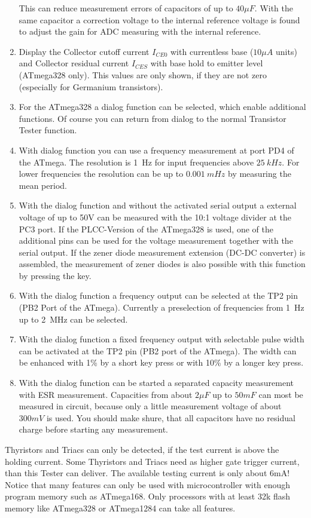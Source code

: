 \begin{enumerate}
This can reduce measurement errors of capacitors of up to \(40 \mu F\).
With the same capacitor a correction voltage to the internal reference voltage is found to adjust the
gain for ADC measuring with the internal reference.
\item Display the Collector cutoff current \(I_{CE0}\) with currentless base (\(10\mu A\) units) and
Collector residual current \(I_{CES}\) with base hold to emitter level (ATmega328 only).
This values are only shown, if they are not zero (especially for Germanium transistors).
\item For the ATmega328 a dialog function can be selected, which enable additional functions.
Of course you can return from dialog to the normal Transistor Tester function.
\item With dialog function you can use a frequency measurement at port PD4 of the ATmega.
The resolution is 1~Hz for input frequencies above \(25~kHz\).
For lower frequencies the resolution can be up to \(0.001~mHz\) by measuring the mean period.
\item With the dialog function and without the activated serial output a external voltage of up to 50V can be measured with
the 10:1 voltage divider at the PC3 port. If the PLCC-Version of the ATmega328 is used, one of the additional
pins can be used for the voltage measurement together with the serial output.
If the zener diode measurement extension (DC-DC converter) is assembled, the measurement of
zener diodes is also possible with this function by pressing the key.
\item With the dialog function a frequency output can be selected at the TP2 pin (PB2 Port of the ATmega).
Currently a preselection of frequencies from 1~Hz up to 2~MHz can be selected.
\item With the dialog function a fixed frequency output with selectable pulse width can be activated at the TP2 pin
(PB2 port of the ATmega). The width can be enhanced with 1\% by a short key press or with 10\% by a longer key press.
\item With the dialog function can be started a separated capacity measurement with ESR measurement.
Capacities from about \(2 \mu F\) up to \(50 mF\) can most be measured in circuit, because only a little
measurement voltage of about \(300 mV\) is used.
You should make shure, that all capacitors have no residual charge before starting any measurement.

\end{enumerate}

Thyristors and Triacs can only be detected, if the test current is above the holding current.
Some Thyristors and Triacs need as higher gate trigger current, than this Tester can deliver.
The available testing current is only about 6mA!
Notice that many features can only be used with microcontroller with enough program memory such as ATmega168.
Only processors with at least 32k flash memory like ATmega328 or ATmega1284 can take all features.


